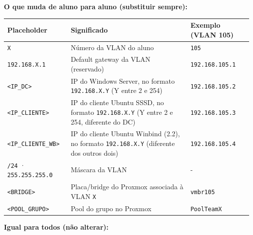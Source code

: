 \textbf{O que muda de aluno para aluno (substituir sempre):}

\begin{center}\small
\begin{tabularx}{\linewidth}{|>{\raggedright\arraybackslash}X|>{\raggedright\arraybackslash}X|>{\raggedright\arraybackslash}X|}
\hline
\rowcolor{azul!10}\textbf{Placeholder} & \textbf{Significado} & \textbf{Exemplo (VLAN 105)} \\
\hline
\texttt{X} & Número da VLAN do aluno & \texttt{105} \\
\hline
\texttt{192.168.X.1} & Default gateway da VLAN (reservado) & \texttt{192.168.105.1} \\
\hline
\texttt{\textless{}IP\_DC\textgreater{}} & IP do Windows Server, no formato \texttt{192.168.X.Y} (Y entre 2 e 254) & \texttt{192.168.105.2} \\
\hline
\texttt{\textless{}IP\_CLIENTE\textgreater{}} & IP do cliente Ubuntu SSSD, no formato \texttt{192.168.X.Y} (Y entre 2 e 254, diferente do DC) & \texttt{192.168.105.3} \\
\hline
\texttt{\textless{}IP\_CLIENTE\_WB\textgreater{}} & IP do cliente Ubuntu Winbind (2.2), no formato \texttt{192.168.X.Y} (diferente dos outros dois) & \texttt{192.168.105.4} \\
\hline
\texttt{/\allowbreak{}24} · \texttt{255.255.255.0} & Máscara da VLAN & - \\
\hline
\texttt{\textless{}BRIDGE\textgreater{}} & Placa/bridge do Proxmox associada à VLAN \texttt{X} & \texttt{vmbr105} \\
\hline
\texttt{\textless{}POOL\_GRUPO\textgreater{}} & Pool do grupo no Proxmox & \texttt{PoolTeamX} \\
\hline
\end{tabularx}
\end{center}

\textbf{Igual para todos (não alterar):}

